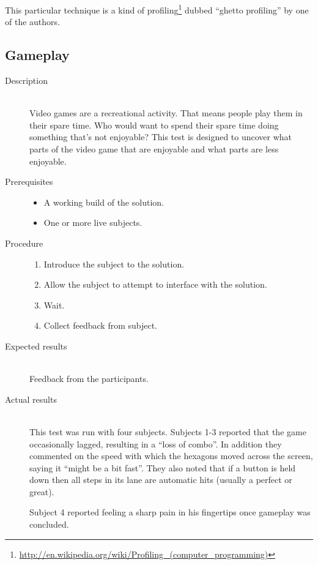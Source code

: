		This particular technique is a kind of profiling\footnote{\url{http://en.wikipedia.org/wiki/Profiling_(computer_programming)}} dubbed ``ghetto profiling'' by one of the authors. 

\subsection{Gameplay}
	\begin{description}
		\item[Description] \hfill \\
			Video games are a recreational activity.
			That means people play them in their spare time.
			Who would want to spend their spare time doing something that's not enjoyable?
			This test is designed to uncover what parts of the video game that are enjoyable and what parts are less enjoyable.
		\item[Prerequisites] \hfill
			\begin{itemize}
				\item{A working build of the solution.}
				\item{One or more live subjects.}
			\end{itemize}
		\item[Procedure] \hfill
			\begin{enumerate}
				\item{Introduce the subject to the solution.}
				\item{Allow the subject to attempt to interface with the solution.}
				\item{Wait.}
				\item{Collect feedback from subject.}
			\end{enumerate}
		\item[Expected results] \hfill \\
			Feedback from the participants.
		\item[Actual results] \hfill \\
			This test was run with four subjects.
			Subjects 1-3 reported that the game occasionally lagged, resulting in a ``loss of combo''.
			In addition they commented on the speed with which the hexagons moved across the screen, saying it ``might be a bit fast''.
			They also noted that if a button is held down then all steps in its lane are automatic hits (usually a perfect or great).

			Subject 4 reported feeling a sharp pain in his fingertips once gameplay was concluded.
	\end{description}


